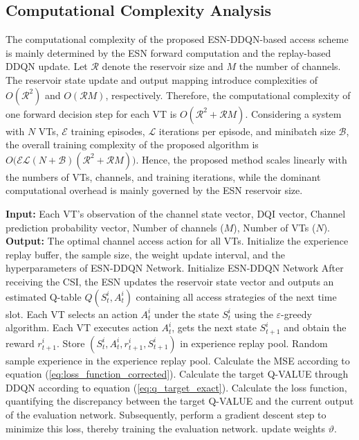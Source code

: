 \documentclass[journal]{IEEEtran}
\begin{document}
\subsection{Computational Complexity Analysis}
The computational complexity of the proposed ESN-DDQN-based access scheme is mainly determined by the ESN forward computation and the replay-based DDQN update. Let $\mathcal{R}$ denote the reservoir size and $M$ the number of channels. The reservoir state update and output mapping introduce complexities of $O(\mathcal{R}^2)$ and $O(\mathcal{R}M)$, respectively. Therefore, the computational complexity of one forward decision step for each VT is $O(\mathcal{R}^2+\mathcal{R}M)$. Considering a system with $N$ VTs, $\mathcal{E}$ training episodes, $\mathcal{L}$ iterations per episode, and minibatch size $\mathcal{B}$, the overall training complexity of the proposed algorithm is $O\big(\mathcal{E}\mathcal{L}(N+\mathcal{B})(\mathcal{R}^2+\mathcal{R}M)\big)$. Hence, the proposed method scales linearly with the numbers of VTs, channels, and training iterations, while the dominant computational overhead is mainly governed by the ESN reservoir size.
\begin{algorithm}[!htbp] 
\caption{High Quality ESN-DDQN-Based Adaptive Access Algorithm}
\label{alg1}
\begin{algorithmic}[1] 
\STATE \textbf{Input:} Each VT's observation of the channel state vector, DQI vector, Channel prediction probability vector, Number of channels ($M$), Number of VTs ($N$).
\STATE \textbf{Output:} The optimal channel access action for all VTs.
\STATE Initialize the experience replay buffer, the sample size, the weight update interval, and the hyperparameters of ESN-DDQN Network.
    \STATE Initialize ESN-DDQN Network
        \STATE After receiving the CSI, the ESN updates the reservoir state vector and outputs an estimated Q-table $Q(S_t^{i},A_t^i)$ containing all access strategies of the next time slot.
        \STATE Each VT selects an action $A_t^i$ under the state $S_t^i$ using the $\varepsilon$-greedy algorithm.
        \STATE Each VT executes action $A_t^i$, gets the next state $S_{t + 1}^{i}$ and obtain the reward $r_{t + 1}^{i}$.
        \STATE Store $(S_t^{i},A_t^i,r_{t + 1}^{i},S_{t + 1}^{i})$ in experience replay pool.
                \STATE Random sample experience in the experience replay pool.
                \STATE Calculate the MSE according to equation (\ref{eq:loss_function_corrected}).
                \STATE Calculate the target Q-VALUE through DDQN according to equation (\ref{eq:q_target_exact}).
                \STATE Calculate the loss function, quantifying the discrepancy between the target Q-VALUE  and the current output of the evaluation network. Subsequently, perform a gradient descent step to minimize this loss, thereby training the evaluation network.
                \STATE update weights $\vartheta$.
            \ENDFOR 
        \ENDIF 
    \ENDFOR 
\ENDFOR 
\end{algorithmic}
\end{algorithm}
\end{document}
